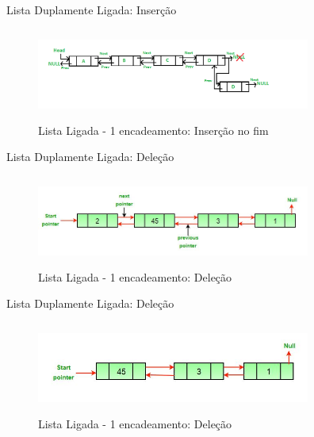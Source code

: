 \begin{frame}
	\begin{block}{Lista Duplamente Ligada: Inserção}
		\begin{figure}[!htb]
			\centering	  				
			\includegraphics[height=3cm, width = 9cm]{./pic/DLL_add_end1.png}
			\caption{Lista Ligada - 1 encadeamento: Inserção no fim}
			\label{fig_LDE_end}
		\end{figure}
	\end{block}
\end{frame}



\begin{frame}
	\begin{block}{Lista Duplamente Ligada: Deleção}
		\begin{figure}[!htb]
			\centering	  				
			\includegraphics[height=3cm, width = 9cm]{./pic/Delete_lincked_list.jpg}
			\caption{Lista Ligada - 1 encadeamento: Deleção}
			\label{fig_LDE_end}
		\end{figure}
	\end{block}
\end{frame}


\begin{frame}
	\begin{block}{Lista Duplamente Ligada: Deleção}
		\begin{figure}[!htb]
			\centering	  				
			\includegraphics[height=3cm, width = 9cm]{./pic/Delete_lincked_list2.jpg}
			\caption{Lista Ligada - 1 encadeamento: Deleção}
			\label{fig_LDE_end}
		\end{figure}
	\end{block}
\end{frame}


